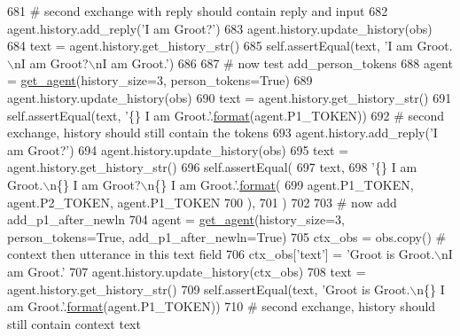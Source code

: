 \begin{DoxyCode}
681         \textcolor{comment}{# second exchange with reply should contain reply and input}
682         agent.history.add\_reply(\textcolor{stringliteral}{'I am Groot?'})
683         agent.history.update\_history(obs)
684         text = agent.history.get\_history\_str()
685         self.assertEqual(text, \textcolor{stringliteral}{'I am Groot.\(\backslash\)nI am Groot?\(\backslash\)nI am Groot.'})
686 
687         \textcolor{comment}{# now test add\_person\_tokens}
688         agent = \hyperlink{namespacetests_1_1test__torch__agent_ae929d109305aaea29fbfa13ecf1f32e9}{get\_agent}(history\_size=3, person\_tokens=\textcolor{keyword}{True})
689         agent.history.update\_history(obs)
690         text = agent.history.get\_history\_str()
691         self.assertEqual(text, \textcolor{stringliteral}{'\{\} I am Groot.'}.\hyperlink{namespaceparlai_1_1chat__service_1_1services_1_1messenger_1_1shared__utils_a32e2e2022b824fbaf80c747160b52a76}{format}(agent.P1\_TOKEN))
692         \textcolor{comment}{# second exchange, history should still contain the tokens}
693         agent.history.add\_reply(\textcolor{stringliteral}{'I am Groot?'})
694         agent.history.update\_history(obs)
695         text = agent.history.get\_history\_str()
696         self.assertEqual(
697             text,
698             \textcolor{stringliteral}{'\{\} I am Groot.\(\backslash\)n\{\} I am Groot?\(\backslash\)n\{\} I am Groot.'}.\hyperlink{namespaceparlai_1_1chat__service_1_1services_1_1messenger_1_1shared__utils_a32e2e2022b824fbaf80c747160b52a76}{format}(
699                 agent.P1\_TOKEN, agent.P2\_TOKEN, agent.P1\_TOKEN
700             ),
701         )
702 
703         \textcolor{comment}{# now add add\_p1\_after\_newln}
704         agent = \hyperlink{namespacetests_1_1test__torch__agent_ae929d109305aaea29fbfa13ecf1f32e9}{get\_agent}(history\_size=3, person\_tokens=\textcolor{keyword}{True}, add\_p1\_after\_newln=\textcolor{keyword}{True})
705         ctx\_obs = obs.copy()  \textcolor{comment}{# context then utterance in this text field}
706         ctx\_obs[\textcolor{stringliteral}{'text'}] = \textcolor{stringliteral}{'Groot is Groot.\(\backslash\)nI am Groot.'}
707         agent.history.update\_history(ctx\_obs)
708         text = agent.history.get\_history\_str()
709         self.assertEqual(text, \textcolor{stringliteral}{'Groot is Groot.\(\backslash\)n\{\} I am Groot.'}.\hyperlink{namespaceparlai_1_1chat__service_1_1services_1_1messenger_1_1shared__utils_a32e2e2022b824fbaf80c747160b52a76}{format}(agent.P1\_TOKEN))
710         \textcolor{comment}{# second exchange, history should still contain context text}

\end{DoxyCode}
